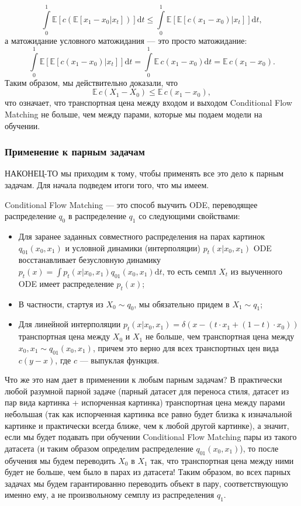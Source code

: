 \documentclass[12pt]{article}
\theoremstyle{definition}
\begin{document}
\[
    \int\limits_{0}^{1} \mathbb{E} \left[ c\left(\mathbb{E}\left[x_1 - x_0 | x_t \right] \right)\right] \mathrm{d} t \leq     \int\limits_{0}^{1} \mathbb{E} \left[ \mathbb{E}\left[c(x_1 - x_0) | x_t \right] \right] \mathrm{d} t,
\]
а матожидание условного матожидания --- это просто матожидание:
\[
    \int\limits_{0}^{1} \mathbb{E} \left[ \mathbb{E}\left[c(x_1 - x_0) | x_t \right] \right] \mathrm{d} t = \int\limits_{0}^{1} \mathbb{E} \,c(x_1 - x_0) \mathrm{d} t = \mathbb{E}\, c(x_1 - x_0).
\]
Таким образом, мы действительно доказали, что
\[
    \mathbb{E}\, c(X_1 - X_0) \leq \mathbb{E}\, c(x_1 - x_0),
\]
что означает, что транспортная цена между входом и выходом Conditional Flow Matching не больше, чем между парами, которые мы подаем модели на обучении.

\subsubsection{Применение к парным задачам}
НАКОНЕЦ-ТО мы приходим к тому, чтобы применять все это дело к парным задачам. Для начала подведем итоги того, что мы имеем.

Conditional Flow Matching --- это способ выучить ODE, переводящее распределение $q_0$ в распределение $q_1$ со следующими свойствами:
\begin{itemize}
    \item Для заранее заданных совместного распределения на парах картинок $q_{01}(x_0, x_1)$ и условной динамики (интерполяции) $p_t(x | x_0, x_1)$ ODE восстанавливает безусловную динамику $p_t(x) = \int p_t(x | x_0, x_1)q_{01}(x_0, x_1) \mathrm{d} t$, то есть семпл $X_t$ из выученного ODE имеет распределение $p_t(x)$;
    \item В частности, стартуя из $X_0 \sim q_0$, мы обязательно придем в $X_1 \sim q_1$;
    \item Для линейной интерполяции $p_t(x | x_0, x_1) = \delta(x - (t \cdot x_1 + (1 - t) \cdot x_0))$ транспортная цена между $X_0$ и $X_1$ не больше, чем транспортная цена между $x_0, x_1 \sim q_{01}(x_0, x_1)$, причем это верно для всех транспортных цен вида $c(y - x)$, где $c$ --- выпуклая функция.
\end{itemize}
Что же это нам дает в применении к любым парным задачам? В практически любой разумной парной задаче (парный датасет для переноса стиля, датасет из пар вида картинка + испорченная картинка) транспортная цена между парами небольшая (так как испорченная картинка все равно будет близка к изначальной картинке и практически всегда ближе, чем к любой другой картинке), а значит, если мы будет подавать при обучении Conditional Flow Matching пары из такого датасета (и таким образом определим распределение $q_{01}(x_0, x_1)$), то после обучения мы будем переводить $X_0$ в $X_1$ так, что транспортная цена между ними будет не больше, чем было в парах из датасета! Таким образом, во всех парных задачах мы будем гарантированно переводить объект в пару, соответствующую именно ему, а не произвольному семплу из распределения $q_1$. 
\end{document}

